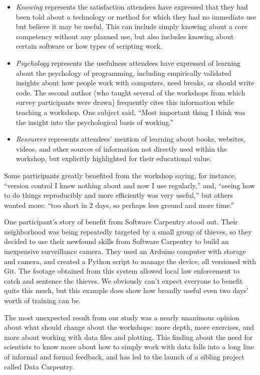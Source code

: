 \documentclass[10pt, twocolumn]{article}
\begin{document}
\begin{itemize}

	\item
	\emph{Knowing} represents the satisfaction attendees have expressed that they had been told about a technology or method
	for which they had no immediate use but believe it may be useful.
	This can include simply knowing about a core competency without any planned use,
	but also includes knowing about certain software or how types of scripting work.
	
	\item
	\emph{Psychology} represents the usefulness attendees have expressed of learning about the psychology of programming,
	including empirically validated insights about how people work with computers,
	need breaks,
	or should write code.
	The second author (who taught several of the workshops from which survey participants were drawn)
	frequently cites this information while teaching a workshop.
        One subject said,
        ``Most important thing I think was the insight into the psychological basis of working.''
	
	\item
	\emph{Resources} represents attendees' mention of learning about books, websites, videos, and other sources of information
	not directly used within the workshop,
	but explicitly highlighted for their educational value.

\end{itemize}

Some participants greatly benefited from the workshop saying,
for instance,
``version control I knew nothing about and now I use regularly,''
and,
``seeing how to do things reproducibly and more efficiently was very useful,''
but others wanted more:
``too short in 2 days, so perhaps less ground and more time.''

One participant's story of benefit from Software Carpentry stood out.
Their neighborhood was being repeatedly targeted by a small group of thieves,
so they decided to use their newfound skills from Software Carpentry to build an inexpensive surveillance camera.
They used an Arduino computer with storage and camera,
and created a Python script to manage the device,
all versioned with Git.
The footage obtained from this system allowed local law enforcement to catch and sentence the thieves.
We obviously can't expect everyone to benefit quite this much,
but this example does show how broadly useful even two days' worth of training can be.

The most unexpected result from our study was a nearly unanimous opinion about what should change about the workshops:
more depth,
more exercises,
and more about working with data files and plotting.
This finding about the need for scientists to know more about how to simply work with data
falls into a long line of informal and formal feedback,
and has led to the launch of a sibling project called Data Carpentry.
\end{document}
